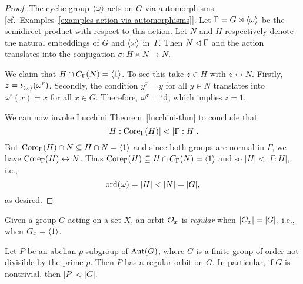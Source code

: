 \begin{proof} The cyclic group $\langle\omega\rangle$ acts on $G$ via automorphisms [cf.~Examples~\ref{examples-action-via-automorphisms}]. Let $\Gamma=G\rtimes\langle\omega\rangle$ be the semidirect product with respect to this action. Let $N$ and $H$ respectively denote the natural embeddings of $G$ and $\langle\omega\rangle$ in~$\Gamma$. Then $N\lhd\Gamma$ and the action translates into the conjugation $\sigma\colon H\times N\to N$.

We claim that $H\cap C_\Gamma(N)=\langle1\rangle$. To see this take $z\in H$ with $z\leftrightarrow N$. Firstly, $z=\iota_{\langle\omega\rangle}(\omega^r)$. Secondly, the condition $y^z=y$ for all $y\in N$ translates into $\omega^r(x)=x$ for all $x\in G$. Therefore, $\omega^r=\operatorname{id}$, which implies $z=1$.

We can now invoke Lucchini Theorem~\ref{lucchini-thm} to conclude that $$
    |H:\Core_\Gamma(H)|<|\Gamma:H|.
$$
But ${\rm Core}_\Gamma(H)\cap N\subseteq H\cap N=\langle1\rangle$ and since both groups are normal in $\Gamma$, we have ${\rm Core}_\Gamma(H)\leftrightarrow N$. Thus ${\rm Core}_\Gamma(H)\subseteq H\cap C_\Gamma(N)=\langle1\rangle$ and so $|H|<|\Gamma: H|$, i.e.,
$$
    {\rm ord}(\omega) = |H| < |N| = |G|,
$$
as desired.  \end{proof}

\begin{defn}
    Given a group\/ $G$ acting on a set\/ $X$, an orbit\/ ${\cal O}_x$ is \textsl{regular} when\/ $|{\cal O}_x|=|G|$, i.e., when\/ $G_x=\langle1\rangle$.
\end{defn}

\begin{cor}\label{regular-aut-orbit}
    Let\/ $P$ be an abelian\/ $p$-subgroup of\/ ${\rm Aut}(G)$, where\/ $G$ is a finite group of order not divisible by the prime\/ $p$. Then\/ $P$ has a regular orbit on\/ $G$. In particular, if\/ $G$ is nontrivial, then\/ $|P| < |G|$.
\end{cor}

